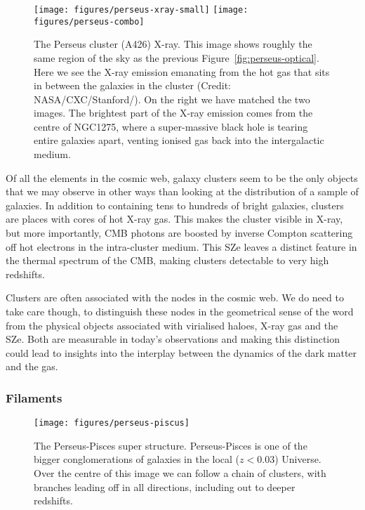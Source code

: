\begin{figure}
    \texttt{[image: figures/perseus-xray-small]}
    \texttt{[image: figures/perseus-combo]}
    \caption{The Perseus cluster (A426) X-ray. This image shows roughly the same region of the sky as the previous Figure~\ref{fig:perseus-optical}. Here we see the X-ray emission emanating from the hot gas that sits in between the galaxies in the cluster (Credit: NASA/CXC/Stanford/\citet{Zhuravleva2014}). On the right we have matched the two images. The brightest part of the X-ray emission comes from the centre of NGC1275, where a super-massive black hole is tearing entire galaxies apart, venting ionised gas back into the intergalactic medium.}\label{fig:perseus-xray}
\end{figure}

Of all the elements in the cosmic web, galaxy clusters seem to be the only objects that we may observe in other ways than looking at the distribution of a sample of galaxies. In addition to containing tens to hundreds of bright galaxies, clusters are places with cores of hot X-ray gas. This makes the cluster visible in X-ray, but more importantly, CMB photons are boosted by inverse Compton scattering off hot electrons in the intra-cluster medium. This \acf{SZe} \citep{Sunyaev1972,Sunyaev1980} leaves a distinct feature in the thermal spectrum of the CMB, making clusters detectable to very high redshifts.

Clusters are often associated with the nodes in the cosmic web. We do need to take care though, to distinguish these nodes in the geometrical sense of the word from the physical objects associated with virialised haloes, X-ray gas and the \acs{SZe}. Both are measurable in today's observations and making this distinction could lead to insights into the interplay between the dynamics of the dark matter and the gas.

\subsubsection{Filaments}
\begin{figure}
    \centering
    \texttt{[image: figures/perseus-piscus]}
    \caption{The Perseus-Pisces super structure. Perseus-Pisces is one of the bigger conglomerations of galaxies in the local ($z < 0.03$) Universe. Over the centre of this image we can follow a chain of clusters, with branches leading off in all directions, including out to deeper redshifts.}\label{fig:intro-pp}
\end{figure}


